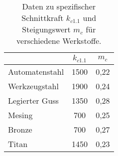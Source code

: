 \documentclass[fleqn,10pt]{techReport} %
\begin{document}
\begin{table}[H]

\begin{tabular}{|l|c|c|}
\hline
 & $k_{c1.1}$ & $m_c$ \\
\hline
Automatenstahl & 1500 & 0,22 \\
\hline
Werkzeugstahl & 1900 & 0,24 \\
\hline
Legierter Guss & 1350 & 0,28 \\
\hline
Mesing & 700 & 0,25 \\
\hline
Bronze & 700 & 0,27 \\
\hline
Titan & 1450 & 0,23 \\
\hline
\end{tabular}
\caption[spezifische Schnittkraft und Steigungswert]{Daten zu spezifischer Schnittkraft $k_{c1.1}$ und Steigungswert $m_c$ für verschiedene Werkstoffe.}
\label{tab:}
\end{table}
\end{document}
